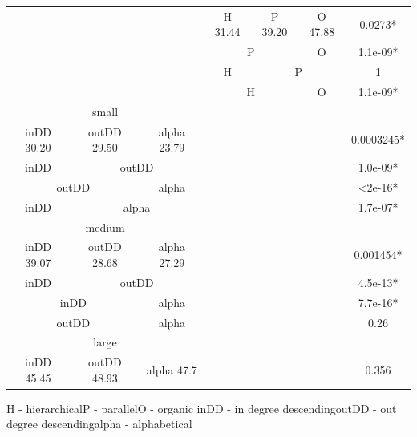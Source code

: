 \documentclass{l4proj}
\begin{document}
\begin{table}[H]
\begin{tabular}{|c|c|c|c|c|c|c|}
\multicolumn{3}{|c|}{}                    & H   31.44    & P   39.20   & O  47.88   & 0.0273*          \\ \cline{4-7} 
\multicolumn{3}{|c|}{}                    & \multicolumn{2}{c|}{P}     & O          & 1.1e-09*         \\ \cline{4-7} 
\multicolumn{3}{|c|}{}                    & H            & \multicolumn{2}{c|}{P}   & 1                \\ \cline{4-7} 
\multicolumn{3}{|c|}{}                    & \multicolumn{2}{c|}{H}     & O          & 1.1e-09*         \\ \hline
\multicolumn{3}{|c|}{small}               & \multicolumn{3}{c|}{\multirow{12}{*}{}} &                  \\ \cline{1-3} \cline{7-7} 
inDD 30.20   & outDD 29.50  & alpha 23.79 & \multicolumn{3}{c|}{}                   & 0.0003245*       \\ \cline{1-3} \cline{7-7} 
inDD         & \multicolumn{2}{c|}{outDD} & \multicolumn{3}{c|}{}                   & 1.0e-09*         \\ \cline{1-3} \cline{7-7} 
\multicolumn{2}{|c|}{outDD} & alpha       & \multicolumn{3}{c|}{}                   & \textless 2e-16* \\ \cline{1-3} \cline{7-7} 
inDD         & \multicolumn{2}{c|}{alpha} & \multicolumn{3}{c|}{}                   & 1.7e-07*         \\ \cline{1-3} \cline{7-7} 
\multicolumn{3}{|c|}{medium}              & \multicolumn{3}{c|}{}                   &                  \\ \cline{1-3} \cline{7-7} 
inDD 39.07   & outDD 28.68  & alpha 27.29 & \multicolumn{3}{c|}{}                   & 0.001454*        \\ \cline{1-3} \cline{7-7} 
inDD         & \multicolumn{2}{c|}{outDD} & \multicolumn{3}{c|}{}                   & 4.5e-13*         \\ \cline{1-3} \cline{7-7} 
\multicolumn{2}{|c|}{inDD}  & alpha       & \multicolumn{3}{c|}{}                   & 7.7e-16*         \\ \cline{1-3} \cline{7-7} 
\multicolumn{2}{|c|}{outDD} & alpha       & \multicolumn{3}{c|}{}                   & 0.26             \\ \cline{1-3} \cline{7-7} 
\multicolumn{3}{|c|}{large}               & \multicolumn{3}{c|}{}                   &                  \\ \cline{1-3} \cline{7-7} 
inDD 45.45   & outDD 48.93  & alpha 47.7  & \multicolumn{3}{c|}{}                   & 0.356            \\ \hline
\end{tabular}
\end{table}
\noindent H - hierarchical\newline P - parallel\newline O - organic \newline inDD - in degree descending\newline outDD - out degree descending\newline alpha - alphabetical
\end{document}
